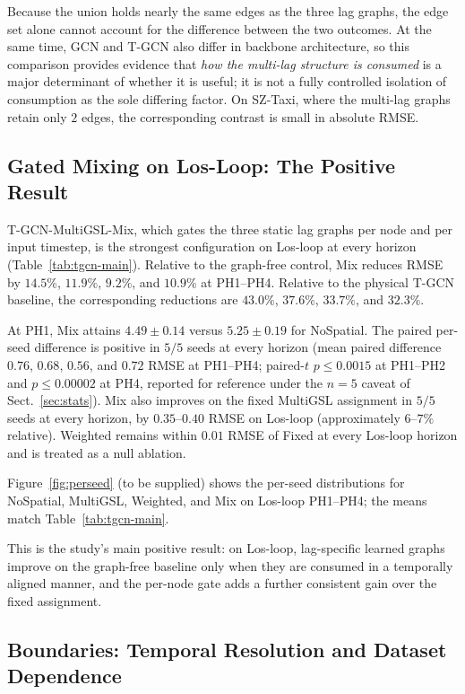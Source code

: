 Because the union holds nearly the same edges as the three lag graphs, the
edge set alone cannot account for the difference between the two outcomes.
At the same time, GCN and T-GCN also differ in backbone architecture, so
this comparison provides evidence that \emph{how the multi-lag structure is
consumed} is a major determinant of whether it is useful; it is not a fully
controlled isolation of consumption as the sole differing factor. On
SZ-Taxi, where the multi-lag graphs retain only $2$ edges, the corresponding
contrast is small in absolute RMSE.

\subsection{Gated Mixing on Los-Loop: The Positive Result}\label{sec:res-mix}

T-GCN-MultiGSL-Mix, which gates the three static lag graphs per node and per
input timestep, is the strongest configuration on Los-loop at every horizon
(Table~\ref{tab:tgcn-main}). Relative to the graph-free control, Mix reduces
RMSE by $14.5\%$, $11.9\%$, $9.2\%$, and $10.9\%$ at PH1--PH4. Relative to
the physical T-GCN baseline, the corresponding reductions are $43.0\%$,
$37.6\%$, $33.7\%$, and $32.3\%$.

At PH1, Mix attains $4.49\pm 0.14$ versus $5.25\pm 0.19$ for NoSpatial. The
paired per-seed difference is positive in $5/5$ seeds at every horizon
(mean paired difference $0.76$, $0.68$, $0.56$, and $0.72$ RMSE at
PH1--PH4; paired-$t$ $p\le 0.0015$ at PH1--PH2 and $p\le 0.00002$ at PH4,
reported for reference under the $n=5$ caveat of Sect.~\ref{sec:stats}).
Mix also improves on the fixed MultiGSL assignment in $5/5$ seeds at every
horizon, by $0.35$--$0.40$ RMSE on Los-loop (approximately $6$--$7\%$
relative). Weighted remains within $0.01$ RMSE of Fixed at every Los-loop
horizon and is treated as a null ablation.

Figure~\ref{fig:perseed} (to be supplied) shows the per-seed distributions
for NoSpatial, MultiGSL, Weighted, and Mix on Los-loop PH1--PH4; the means
match Table~\ref{tab:tgcn-main}.

This is the study's main positive result: on Los-loop, lag-specific learned
graphs improve on the graph-free baseline only when they are consumed in a
temporally aligned manner, and the per-node gate adds a further consistent
gain over the fixed assignment.

\subsection{Boundaries: Temporal Resolution and Dataset Dependence}\label{sec:res-boundaries}

